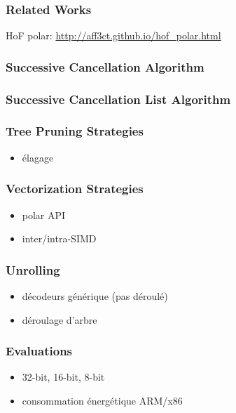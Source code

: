 \subsubsection{Related Works}

HoF polar: \url{http://aff3ct.github.io/hof_polar.html}

\subsubsection{Successive Cancellation Algorithm}

\subsubsection{Successive Cancellation List Algorithm}

\subsubsection{Tree Pruning Strategies}

\begin{itemize}
  \item élagage
\end{itemize}

\subsubsection{Vectorization Strategies}

\begin{itemize}
  \item polar API
  \item inter/intra-SIMD
\end{itemize}

\subsubsection{Unrolling}

\begin{itemize}
  \item décodeurs générique (pas déroulé)
  \item déroulage d'arbre
\end{itemize}

\subsubsection{Evaluations}

\begin{itemize}
  \item 32-bit, 16-bit, 8-bit
  \item consommation énergétique ARM/x86
\end{itemize}

